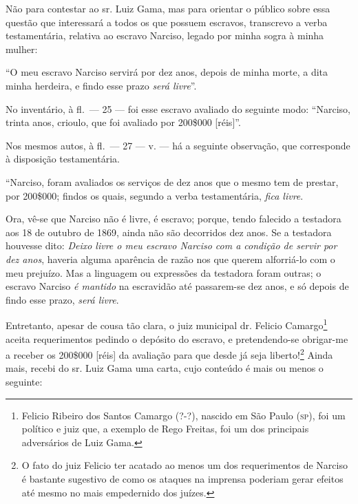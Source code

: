 {Não para contestar ao sr. Luiz Gama, mas para orientar o público sobre
essa questão que interessará a todos os que possuem escravos, transcrevo
a verba testamentária, relativa ao escravo Narciso, legado por minha
sogra à minha mulher:

``O meu escravo Narciso servirá por dez anos, depois de minha morte, a
dita minha herdeira, e findo esse prazo \emph{será livre}''.

No inventário, à fl.~--- 25 --- foi esse escravo avaliado do seguinte
modo: ``Narciso, trinta anos, crioulo, que foi avaliado por 200\$000
{[}réis{]}''.

Nos mesmos autos, à fl.~--- 27 --- v. --- há a seguinte observação, que
corresponde à disposição testamentária.

``Narciso, foram avaliados os serviços de dez anos que o mesmo tem de
prestar, por 200\$000; findos os quais, segundo a verba testamentária,
\emph{fica livre}.

Ora, vê-se que Narciso não é livre, é escravo; porque, tendo falecido a
testadora aos 18 de outubro de 1869, ainda não são decorridos dez anos.
Se a testadora houvesse dito: \emph{Deixo livre o meu escravo Narciso
com a condição de servir por dez anos}, haveria alguma aparência de
razão nos que querem alforriá-lo com o meu prejuízo. Mas a linguagem ou
expressões da testadora foram outras; o escravo Narciso \emph{é mantido}
na escravidão até passarem-se dez anos, e só depois de findo esse prazo,
\emph{será livre}.

Entretanto, apesar de cousa tão clara, o juiz municipal dr. Felicio
Camargo\footnote{ Felicio Ribeiro dos Santos Camargo (?-?), nascido
  em São Paulo (\textsc{sp}), foi um político e juiz que, a exemplo de Rego
  Freitas, foi um dos principais adversários de Luiz Gama.} aceita
requerimentos pedindo o depósito do escravo, e pretendendo-se obrigar-me
a receber os 200\$000 {[}réis{]} da avaliação para que desde já seja
liberto!\footnote{ O fato do juiz Felicio ter acatado ao menos um
  dos requerimentos de Narciso é bastante sugestivo de como os ataques
  na imprensa poderiam gerar efeitos até mesmo no mais empedernido dos
  juízes.} Ainda mais, recebi do sr. Luiz Gama uma carta, cujo conteúdo
é mais ou menos o seguinte:

}
